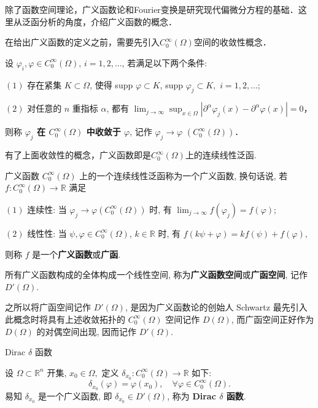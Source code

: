 
除了函数空间理论，广义函数论和Fourier变换是研究现代偏微分方程的基础．这里从泛函分析的角度，介绍广义函数的概念．

在给出广义函数的定义之前，需要先引入$C_0^\infty(\Omega)$空间的收敛性概念．

\begin{definition}{}
设 $\varphi_i,\varphi\in C_0^\infty(\Omega),\,i=1,2,...$,  若满足以下两个条件:

$(1)$ 存在紧集 $K\subset\Omega$, 使得 supp $\varphi\subset K$, supp $\varphi_{j}\subset K,$
$i=1,2,...;$ 

$(2)$ 对任意的 $n$ 重指标 $\alpha$, 都有 ${\displaystyle \lim_{j\rightarrow\infty}{\displaystyle \sup_{x\in\Omega}\left|\partial^{\alpha}\varphi_{j}(x)-\partial^{\alpha}\varphi(x)\right|=0}}$，


则称\textbf{ \textbf{$\varphi_{j}$ 在 $C_{0}^{\infty}(\Omega)$ 中收敛于 $\varphi$}}, 记作 
$\varphi_{j}\rightarrow\varphi$ $(C_{0}^{\infty}(\Omega))$．

\end{definition}

有了上面收敛性的概念，广义函数即是$C_0^\infty(\Omega)$上的连续线性泛函.

\begin{definition}{广义函数}
$C_{0}^{\infty}(\Omega)$ 上的一个连续线性泛函称为一个广义函数, 换句话说, 若 $f:C_{0}^{\infty}(\Omega)\rightarrow\mathbb{R}$
满足

$(1)$ 连续性: 当 $\varphi_{j}\rightarrow\varphi(C_{0}^{\infty}(\Omega))$
时, 有 ${\displaystyle \lim_{j\rightarrow\infty}f(\varphi_{j})=f(\varphi)}$; 

$(2)$ 线性性: 当 $\psi,\varphi\in C_{0}^{\infty}(\Omega)$, $k\in\mathbb{R}$
时, 有 $f(k\psi+\varphi)=kf(\psi)+f(\varphi),$

则称 $f$ 是一个\textbf{广义函数}或\textbf{广函}. 

所有广义函数构成的全体构成一个线性空间, 称为\textbf{广义函数空间}或\textbf{广函空间}, 记作 $D'(\Omega)$. 

\end{definition}

之所以将广函空间记作 $D'(\Omega)$, 是因为广义函数论的创始人 Schwartz 最先引入此概念时将具有上述收敛拓扑的
$C_{0}^{\infty}(\Omega)$ 空间记作 $D(\Omega)$, 而广函空间正好作为 $D(\Omega)$
的对偶空间出现, 因而记作 $D'(\Omega)$. 
\begin{example}{$\mathrm{Dirac}$ $\delta$ 函数
}

设 $\Omega\subset\mathbb{R}^{n}$ 开集, $x_{0}\in\Omega,$ 定义 $\delta_{x_{0}}:C_{0}^{\infty}(\Omega)\rightarrow\mathbb{R}$
如下: 
\[
\delta_{x_{0}}(\varphi)=\varphi(x_{0}),\quad\forall\varphi\in C_{0}^{\infty}(\Omega).
\]
易知 $\delta_{x_{0}}$ 是一个广义函数, 即 $\delta_{x_{0}}\in D'(\Omega)$, 称为
\textbf{Dirac $\delta$ 函数}. 
\end{example}
